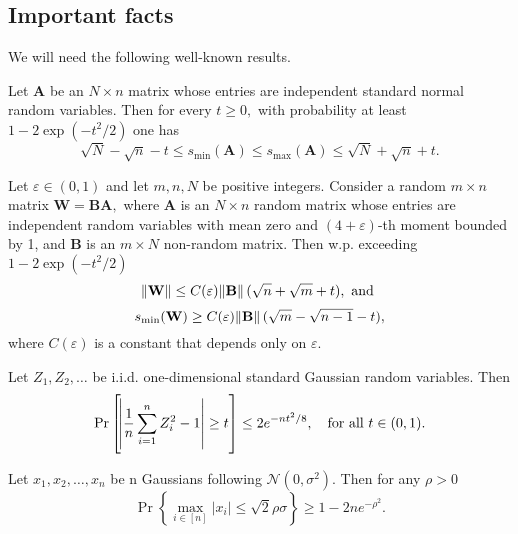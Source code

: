 \subsection{Important facts}

We will need the following well-known results. 
\begin{fact}\label{thm:norm_W}
	Let $\mathbf{A}$ be an $N \times n$ matrix whose entries are independent standard normal random variables. Then for every $t \geq 0,$ with probability at least $1-2 \exp \left(-t^{2} / 2\right)$ one has
	\[
	\sqrt{N}-\sqrt{n}-t \leq s_{\min }(\mathbf{A}) \leq s_{\max }(\mathbf{A}) \leq \sqrt{N}+\sqrt{n}+t.
	\]
\end{fact}


\begin{fact}\label{thm:norm_BA}
	Let $\varepsilon \in(0,1)$ and let $m, n, N$ be positive integers. Consider a random $m \times n$ matrix $\mathbf{W}=\mathbf{B} \mathbf{A},$ where $\mathbf{A}$ is an $N \times n$ random matrix whose
	entries are independent random variables with mean zero and $(4+\varepsilon)$-th moment bounded by 1, and $\mathbf{B}$ is an $m \times N$ non-random matrix. Then w.p. exceeding $1 - 2 \exp{(-t^2/2)}$
	$$ 
	\|\mathbf{W}\| \leq C(\varepsilon) \norm{\mathbf{B}}(\sqrt{n}+\sqrt{m} + t), \mbox{ and }
	$$
	$$ 
	s_{\min}(\mathbf{W}) \geq C(\varepsilon) \norm{\mathbf{B}}(\sqrt{m} - \sqrt{n-1} - t),
	$$
	where $C(\varepsilon)$ is a constant that depends only on $\varepsilon$. 
\end{fact}


\begin{fact}\label{lem:chi-squared}
	Let $Z_1, Z_2, \ldots$ be i.i.d. one-dimensional standard Gaussian random variables. Then
	\begin{align*}
		\Pr\left[\abs{\frac{1}{n}\sum_{i=1}^n Z_i^2 - 1} \geq t\right] \leq 2 e^{-nt^2/8}, \quad \text{for all } t \in (0, 1).
	\end{align*}
\end{fact}


\begin{fact}\label{fact:max_gauss} 
	Let $x_{1}, x_{2}, \ldots, x_{n}$ be n Gaussians following $\mathcal{N}\left(0, \sigma^{2}\right) .$ Then
	for any $\rho>0$ 
	$$
	\operatorname{Pr}\left\{\max _{i \in[n]}\left|x_{i}\right| \leq \sqrt{2}\rho \sigma \right\} \geq 1-2ne^{-\rho^2}.
	$$
\end{fact}

